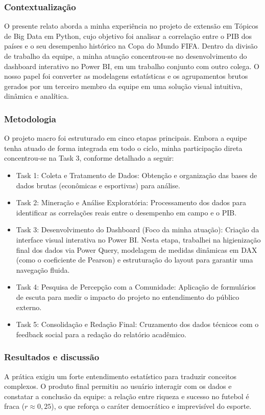 \documentclass[12pt, a4paper, brazil]{article}
\begin{document}
\subsubsection{Contextualização}
O presente relato aborda a minha experiência no projeto de extensão em Tópicos de Big Data em Python, cujo objetivo foi analisar a correlação entre o PIB dos países e o seu desempenho histórico na Copa do Mundo FIFA. Dentro da divisão de trabalho da equipe, a minha atuação concentrou-se no desenvolvimento do dashboard interativo no Power BI, em um trabalho conjunto com outro colega. O nosso papel foi converter as modelagens estatísticas e os agrupamentos brutos gerados por um terceiro membro da equipe em uma solução visual intuitiva, dinâmica e analítica.

\subsubsection{Metodologia}
O projeto macro foi estruturado em cinco etapas principais. Embora a equipe tenha atuado de forma integrada em todo o ciclo, minha participação direta concentrou-se na Task 3, conforme detalhado a seguir:
\begin{itemize}
    \item Task 1: Coleta e Tratamento de Dados: Obtenção e organização das bases de dados brutas (econômicas e esportivas) para análise.
    \item Task 2: Mineração e Análise Exploratória: Processamento dos dados para identificar as correlações reais entre o desempenho em campo e o PIB.
    \item Task 3: Desenvolvimento do Dashboard (Foco da minha atuação): Criação da interface visual interativa no Power BI. Nesta etapa, trabalhei na higienização final dos dados via Power Query, modelagem de medidas dinâmicas em DAX (como o coeficiente de Pearson) e estruturação do layout para garantir uma navegação fluida.
    \item Task 4: Pesquisa de Percepção com a Comunidade: Aplicação de formulários de escuta para medir o impacto do projeto no entendimento do público externo.
    \item Task 5: Consolidação e Redação Final: Cruzamento dos dados técnicos com o feedback social para a redação do relatório acadêmico.
\end{itemize}

\subsubsection{Resultados e discussão}
A prática exigiu um forte entendimento estatístico para traduzir conceitos complexos. O produto final permitiu ao usuário interagir com os dados e constatar a conclusão da equipe: a relação entre riqueza e sucesso no futebol é fraca ($r \approx 0,25$), o que reforça o caráter democrático e imprevisível do esporte.
\end{document}
